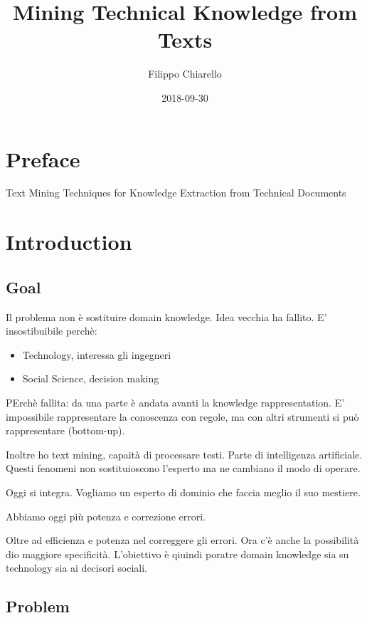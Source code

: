 \documentclass[]{book}
\title{Mining Technical Knowledge from Texts}
\author{Filippo Chiarello}
\date{2018-09-30}
\providecommand{\tightlist}{%
  \setlength{\itemsep}{0pt}\setlength{\parskip}{0pt}}
\begin{document}
\maketitle

{
\setcounter{tocdepth}{1}
\tableofcontents
}
\chapter*{Preface}\label{preface}

Text Mining Techniques for Knowledge Extraction from Technical Documents

\chapter{Introduction}\label{introduction}

\section{Goal}\label{goal}

Il problema non è sostituire domain knowledge. Idea vecchia ha fallito.
E' insostibuibile perchè:

\begin{itemize}
\tightlist
\item
  Technology, interessa gli ingegneri
\item
  Social Science, decision making
\end{itemize}

PErchè fallita: da una parte è andata avanti la knowledge
rappresentation. E' impossibile rappresentare la conoscenza con regole,
ma con altri strumenti si può rappresentare (bottom-up).

Inoltre ho text mining, capaità di processare testi. Parte di
intelligenza artificiale. Questi fenomeni non sostituioscono l'esperto
ma ne cambiano il modo di operare.

Oggi si integra. Vogliamo un esperto di dominio che faccia meglio il suo
mestiere.

Abbiamo oggi più potenza e correzione errori.

Oltre ad efficienza e potenza nel correggere gli errori. Ora c'è anche
la possibilità dio maggiore specificità. L'obiettivo è qiuindi poratre
domain knowledge sia su technology sia ai decisori sociali.

\section{Problem}\label{problem}
\end{document}
